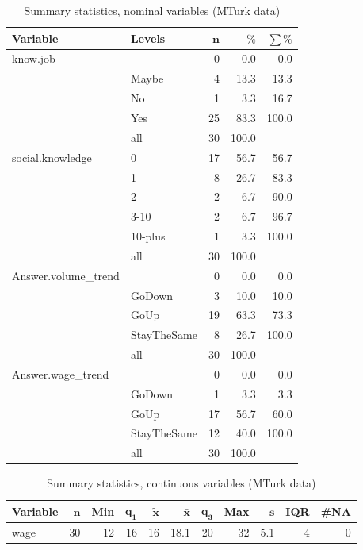 \documentclass[a4paper,10pt]{article}\usepackage[]{graphicx}\usepackage[]{color}
\begin{document}
\begin{table}[ht]
\centering
{\footnotesize
\begin{tabular}{ll|rrr}
 \textbf{Variable} & \textbf{Levels} & $\mathbf{n}$ & $\mathbf{\%}$ & $\mathbf{\sum \%}$ \\ 
  \hline
know.job &  & 0 & 0.0 & 0.0 \\ 
   & Maybe & 4 & 13.3 & 13.3 \\ 
   & No & 1 & 3.3 & 16.7 \\ 
   & Yes & 25 & 83.3 & 100.0 \\ 
   \hline
 & all & 30 & 100.0 &  \\ 
   \hline
\hline
social.knowledge & 0 & 17 & 56.7 & 56.7 \\ 
   & 1 & 8 & 26.7 & 83.3 \\ 
   & 2 & 2 & 6.7 & 90.0 \\ 
   & 3-10 & 2 & 6.7 & 96.7 \\ 
   & 10-plus & 1 & 3.3 & 100.0 \\ 
   \hline
 & all & 30 & 100.0 &  \\ 
   \hline
\hline
Answer.volume\_trend &  & 0 & 0.0 & 0.0 \\ 
   & GoDown & 3 & 10.0 & 10.0 \\ 
   & GoUp & 19 & 63.3 & 73.3 \\ 
   & StayTheSame & 8 & 26.7 & 100.0 \\ 
   \hline
 & all & 30 & 100.0 &  \\ 
   \hline
\hline
Answer.wage\_trend &  & 0 & 0.0 & 0.0 \\ 
   & GoDown & 1 & 3.3 & 3.3 \\ 
   & GoUp & 17 & 56.7 & 60.0 \\ 
   & StayTheSame & 12 & 40.0 & 100.0 \\ 
   \hline
 & all & 30 & 100.0 &  \\ 
   \hline
\hline
\end{tabular}
}
\caption{Summary statistics, nominal variables (MTurk data)} 
\label{tab1:33-3010}
\end{table}
\begin{table}[ht]
\centering
{\footnotesize
\begin{tabular}{lrrrrrrrrrr}
 \textbf{Variable} & $\mathbf{n}$ & \textbf{Min} & $\mathbf{q_1}$ & $\mathbf{\widetilde{x}}$ & $\mathbf{\bar{x}}$ & $\mathbf{q_3}$ & \textbf{Max} & $\mathbf{s}$ & \textbf{IQR} & \textbf{\#NA} \\ 
  \hline
wage & 30 & 12 & 16 & 16 & 18.1 & 20 & 32 & 5.1 & 4 & 0 \\ 
  \end{tabular}
}
\caption{Summary statistics, continuous variables (MTurk data)} 
\label{tab2:33-3010}
\end{table}
\end{document}
